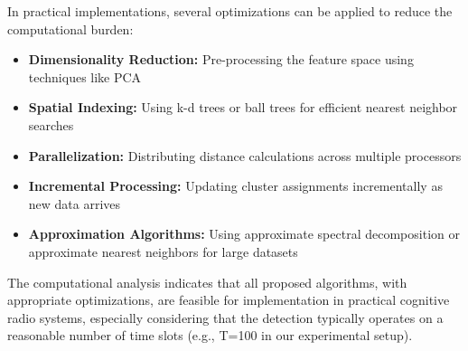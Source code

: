 In practical implementations, several optimizations can be applied to reduce the computational burden:

\begin{itemize}
    \item \textbf{Dimensionality Reduction:} Pre-processing the feature space using techniques like PCA
    \item \textbf{Spatial Indexing:} Using k-d trees or ball trees for efficient nearest neighbor searches
    \item \textbf{Parallelization:} Distributing distance calculations across multiple processors
    \item \textbf{Incremental Processing:} Updating cluster assignments incrementally as new data arrives
    \item \textbf{Approximation Algorithms:} Using approximate spectral decomposition or approximate nearest neighbors for large datasets
\end{itemize}

The computational analysis indicates that all proposed algorithms, with appropriate optimizations, are feasible for implementation in practical cognitive radio systems, especially considering that the detection typically operates on a reasonable number of time slots (e.g., T=100 in our experimental setup).
